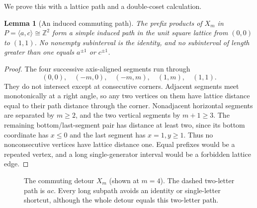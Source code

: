 \documentclass[11pt,a4paper]{article}
\newtheorem{lemma}[theorem]{Lemma}
\theoremstyle{definition}\newtheorem{definition}[theorem]{Definition}
\theoremstyle{remark}\newtheorem{remark}[theorem]{Remark}
\newcommand{\Z}{\mathbb Z}
\begin{document}
We prove this with a lattice path and a double-coset calculation.

\begin{lemma}[An induced commuting path]\label{lem:path}
The prefix products of $X_m$ in $P=\langle a,c\rangle\cong\Z^2$
form a simple induced path in the unit square lattice from $(0,0)$ to
$(1,1)$. No nonempty subinterval is the identity, and no subinterval of
length greater than one equals $a^{\pm1}$ or $c^{\pm1}$.
\end{lemma}
\begin{proof}
The four successive axis-aligned segments run through
\[
 (0,0),\quad (-m,0),\quad(-m,m),\quad(1,m),\quad(1,1).
\]
They do not intersect except at consecutive corners. Adjacent segments
meet monotonically at a right angle, so any two vertices on them have
lattice distance equal to their path distance through the corner.
Nonadjacent horizontal segments are separated by $m\ge2$, and the two
vertical segments by $m+1\ge3$. The remaining bottom/last-segment pair has
distance at least two, since its bottom coordinate has $x\le0$ and the
last segment has $x=1,y\ge1$. Thus no nonconsecutive vertices have lattice
distance one. Equal prefixes would be a repeated vertex, and a long
single-generator interval would be a forbidden lattice edge.
\end{proof}

\begin{figure}[ht]
\centering
{}
\caption{The commuting detour $X_m$ (shown at $m=4$). The dashed two-letter
path is $ac$. Every long subpath avoids an identity or single-letter
shortcut, although the whole detour equals this two-letter path.}
\end{figure}
\end{document}

